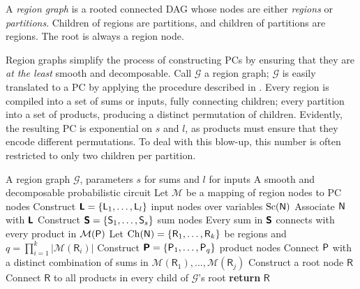 \begin{definition}
  A \emph{region graph} is a rooted connected DAG whose nodes are either \emph{regions} or
  \emph{partitions}. Children of regions are partitions, and children of partitions are regions.
  The root is always a region node.
\end{definition}

Region graphs simplify the process of constructing PCs by ensuring that they are \emph{at the
least} smooth and decomposable. Call $\mathcal{G}$ a region graph; $\mathcal{G}$ is easily
translated to a PC by applying the procedure described in . Every region is
compiled into a set of sums or inputs, fully connecting children; every partition into a set of
products, producing a distinct permutation of children. Evidently, the resulting PC is exponential
on $s$ and $l$, as products must ensure that they encode different permutations. To deal with this
blow-up, this number is often restricted to only two children per partition.

\begin{algorithm}[t]
  \caption{}\label{alg:region2pc}
  \begin{algorithmic}[1]
    \Require A region graph $\mathcal{G}$, parameters $s$ for sums and $l$ for inputs
    \Ensure A smooth and decomposable probabilistic circuit
    \State Let $\mathcal{M}$ be a mapping of region nodes to PC nodes
          \State Construct $\operatorname{\textup{\textsf{\textbf{L}}}}=\{\operatorname{\textup{\textsf{L}}}_1,\ldots,\operatorname{\textup{\textsf{L}}}_l\}$ input nodes over variables $\operatorname*{\normalfont{Sc}}(\operatorname{\textup{\textsf{N}}})$
          \State Associate $\operatorname{\textup{\textsf{N}}}$ with $\operatorname{\textup{\textsf{\textbf{L}}}}$
        \Else
          \State Construct $\operatorname{\textup{\textsf{\textbf{S}}}}=\{\operatorname{\textup{\textsf{S}}}_1,\ldots,\operatorname{\textup{\textsf{S}}}_s\}$ sum nodes
            \State Every sum in $\operatorname{\textup{\textsf{\textbf{S}}}}$ connects with every product in $\mathcal{M}(\operatorname{\textup{\textsf{P}}})$
          \EndFor
        \EndIf
        \State Let $\operatorname*{\normalfont{Ch}}(\operatorname{\textup{\textsf{N}}})=\{\textsf{R}_1,\ldots,\textsf{R}_k\}$ be regions and $q=\prod_{i=1}^k
          |\mathcal{M}(\textsf{R}_i)|$
        \State Construct $\operatorname{\textup{\textsf{\textbf{P}}}}=\{\operatorname{\textup{\textsf{P}}}_1,\ldots,\operatorname{\textup{\textsf{P}}}_q\}$ product nodes
          \State Connect $\operatorname{\textup{\textsf{P}}}$ with a distinct combination of sums in $\mathcal{M}(\textsf{R}_1),
          \ldots,\mathcal{M}(\textsf{R}_j)$
        \EndFor
      \EndIf
    \EndFor
    \State Construct a root node $\textsf{R}$
    \State Connect $\textsf{R}$ to all products in every child of $\mathcal{G}$'s root
    \State \textbf{return} $\textsf{R}$
  \end{algorithmic}
\end{algorithm}

